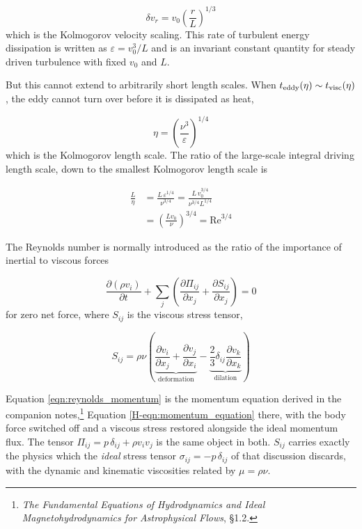 \documentclass[notoc]{tufte-handout}
\begin{document}
\begin{equation}
\boxed{ \delta v_r = v_0 \left( \frac{r}{L} \right)^{1/3} }
\end{equation}
%
which is the Kolmogorov velocity scaling. This rate of turbulent energy dissipation is written as $\varepsilon = v_0^3 / L$ and is an invariant constant quantity for steady driven turbulence with fixed $v_0$ and $L$.

But this cannot extend to arbitrarily short length scales. When $t_{\rm eddy}(\eta) \sim t_{\rm visc}(\eta)$, the eddy cannot turn over before it is dissipated as heat,

\begin{equation}
\eta = \left( \frac{\nu^3}{\varepsilon} \right)^{1/4}
\end{equation}
%
which is the Kolmogorov length scale. The ratio of the large-scale integral driving length scale, down to the smallest Kolmogorov length scale is

\begin{align}
\frac{L}{\eta} & = \frac{L \, \varepsilon^{1/4}}{\nu^{3/4}} = \frac{L \, v_0^{3/4}}{\nu^{3/4} L^{1/4}} \\
& = \left( \frac{L v_0}{\nu} \right)^{3/4} = \mathrm{Re}^{3/4}
\label{eqn:Rescaling}
\end{align}

The Reynolds number is normally introduced as the ratio of the importance of inertial to viscous forces

\begin{equation}
\frac{\partial (\rho v_i)}{\partial t} + \sum_j \left( \frac{\partial \Pi_{ij}}{\partial x_j} + \frac{\partial S_{ij}}{\partial x_j} \right) = 0
\label{eqn:reynolds_momentum}
\end{equation}
%
for zero net force, where $S_{ij}$ is the viscous stress tensor,

\begin{equation}
S_{ij} = \rho \nu \left( \underbrace{\frac{\partial v_i}{\partial x_j} + \frac{\partial v_j}{\partial x_i}}_{\text{deformation}} - \underbrace{\frac{2}{3}\delta_{ij}\frac{\partial v_k}{\partial x_k}}_{\text{dilation}} \right)
\end{equation}

Equation \ref{eqn:reynolds_momentum} is the momentum equation derived in the companion notes,\footnote{{\it The Fundamental Equations of Hydrodynamics and Ideal Magnetohydrodynamics for Astrophysical Flows}, \S 1.2.} Equation \ref{H-eqn:momentum_equation} there, with the body force switched off and a viscous stress restored alongside the ideal momentum flux. The tensor $\Pi_{ij} = p\,\delta_{ij} + \rho v_i v_j$ is the same object in both. $S_{ij}$ carries exactly the physics which the {\it ideal} stress tensor $\sigma_{ij} = -p\,\delta_{ij}$ of that discussion discards, with the dynamic and kinematic viscosities related by $\mu = \rho\nu$.
\end{document}
